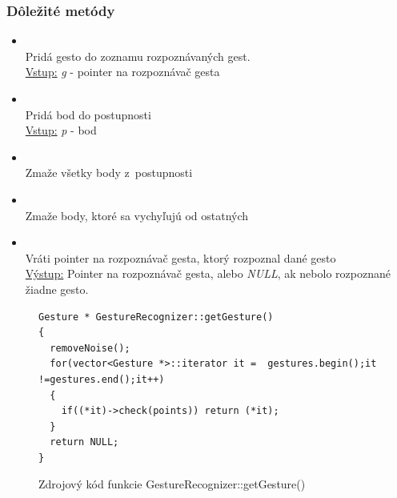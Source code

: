 \subsubsection{Dôležité metódy}
\begin{itemize}
\item {}
\\Pridá gesto do zoznamu rozpoznávaných gest.
\\ \underline{Vstup:} \textit{g} - pointer na rozpoznávač gesta
\item {}
\\Pridá bod do postupnosti
\\ \underline{Vstup:} \textit{p} - bod
\item {}
\\Zmaže všetky body z~postupnosti
\item {}
\\Zmaže body, ktoré sa vychyľujú od ostatných
\item {}
\\Vráti pointer na rozpoznávač gesta, ktorý rozpoznal dané gesto
\\ \underline{Výstup:} Pointer na rozpoznávač gesta, alebo \textit{NULL}, ak nebolo rozpoznané žiadne gesto.
\end{itemize}

\begin{figure}[htp]
\begin{lstlisting}
Gesture * GestureRecognizer::getGesture()
{
  removeNoise();
  for(vector<Gesture *>::iterator it =  gestures.begin();it !=gestures.end();it++)
  {
    if((*it)->check(points)) return (*it);
  }
  return NULL;
}
\end{lstlisting}
\caption{Zdrojový kód funkcie GestureRecognizer::getGesture()}
\label{fig:getGesture}
\end{figure}


